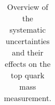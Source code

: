 \begin{table}[!htp]
\begin{center}
\begin{tabular}{|l|c|}
\end{tabular}
\caption{\label{tab:top_mass_systematics}Overview of the systematic uncertainties
and their effects on the top quark mass measurement.}
\end{center}
\end{table}








